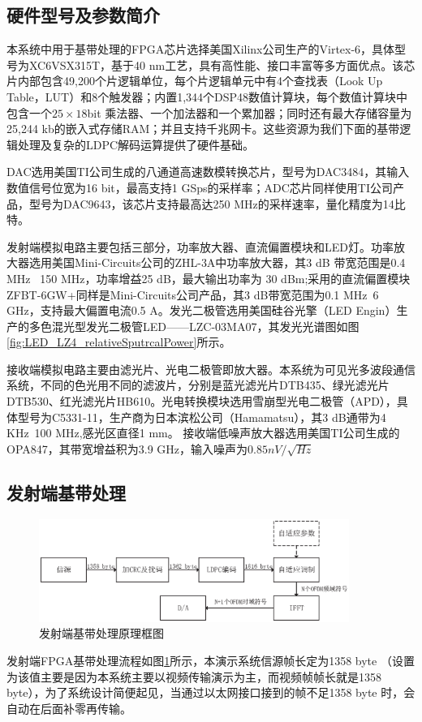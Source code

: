\subsection{硬件型号及参数简介}
本系统中用于基带处理的FPGA芯片选择美国Xilinx公司生产的Virtex-6，具体型号为XC6VSX315T，基于40 nm工艺，具有高性能、接口丰富等多方面优点。该芯片内部包含49,200个片逻辑单位，每个片逻辑单元中有4个查找表（Look Up Table，LUT）和8个触发器；内置1,344个DSP48数值计算块，每个数值计算块中包含一个$25\times 18$bit 乘法器、一个加法器和一个累加器；同时还有最大存储容量为25,244 kb的嵌入式存储RAM；并且支持千兆网卡\cite{FPGAIntroduciton}。这些资源为我们下面的基带逻辑处理及复杂的LDPC解码运算提供了硬件基础。

DAC选用美国TI公司生成的八通道高速数模转换芯片，型号为DAC3484，其输入数值信号位宽为16 bit，最高支持1 GSps的采样率；ADC芯片同样使用TI公司产品，型号为DAC9643，该芯片支持最高达250 MHz的采样速率，量化精度为14比特。

发射端模拟电路主要包括三部分，功率放大器、直流偏置模块和LED灯。功率放大器选用美国Mini-Circuits公司的ZHL-3A中功率放大器，其3 dB 带宽范围是0.4 MHz ~150 MHz，功率增益25 dB，最大输出功率为 30 dBm;采用的直流偏置模块ZFBT-6GW+同样是Mini-Circuits公司产品，其3 dB带宽范围为0.1 MHz~6 GHz，支持最大偏置电流0.5 A。发光二极管选用美国硅谷光擎（LED Engin）生产的多色混光型发光二极管LED——LZC-03MA07，其发光光谱图如图\ref{fig:LED_LZ4_relativeSputrcalPower}所示。

接收端模拟电路主要由滤光片、光电二极管即放大器。本系统为可见光多波段通信系统，不同的色光用不同的滤波片，分别是蓝光滤光片DTB435、绿光滤光片DTB530、红光滤光片HB610。光电转换模块选用雪崩型光电二极管（APD），具体型号为C5331-11，生产商为日本滨松公司（Hamamatsu），其3 dB通带为4 KHz~100 MHz,感光区直径1 mm。 接收端低噪声放大器选用美国TI公司生成的OPA847，其带宽增益积为3.9 GHz，输入噪声为$0.85 nV/\sqrt{Hz}$
\subsection{发射端基带处理}
\begin{figure}[htbp]
\centering
\includegraphics[width=0.9\textwidth]{figures/chapter-5/TransmitterSchematic.eps}
\caption{发射端基带处理原理框图}
\label{fig:TransmitterSchematic}
\end{figure}
发射端FPGA基带处理流程如图\ref{fig:TransmitterSchematic}所示，本演示系统信源帧长定为1358 byte （设置为该值主要是因为本系统主要以视频传输演示为主，而视频帧帧长就是1358 byte），为了系统设计简便起见，当通过以太网接口接到的帧不足1358 byte 时，会自动在后面补零再传输。

